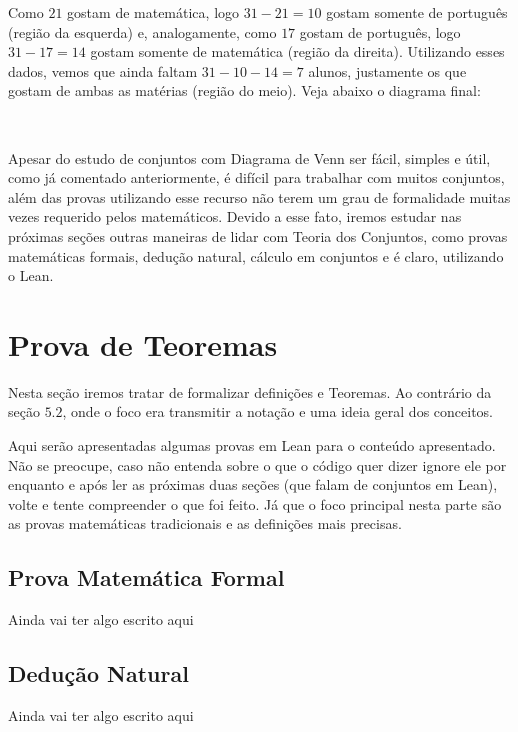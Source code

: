   Como $21$ gostam de matemática, logo $31-21=10$ gostam somente de português (região da esquerda) e, analogamente, como $17$ gostam de português, logo $31-17=14$ gostam somente de matemática (região da direita). Utilizando esses dados, vemos que ainda faltam $31-10-14=7$ alunos, justamente os que gostam de ambas as matérias (região do meio). Veja abaixo o diagrama final:


  $\qquad$

  Apesar do estudo de conjuntos com Diagrama de Venn ser fácil, simples e útil, como já comentado anteriormente, é difícil para trabalhar com muitos conjuntos, além das provas utilizando esse recurso não terem um grau de formalidade muitas vezes requerido pelos matemáticos. Devido a esse fato, iremos estudar nas próximas seções outras maneiras de lidar com Teoria dos Conjuntos, como provas matemáticas formais, dedução natural, cálculo em conjuntos e é claro, utilizando o Lean.

\section{Prova de Teoremas}
Nesta seção iremos tratar de formalizar definições e Teoremas. Ao contrário da seção $5.2$, onde o foco era transmitir a notação e uma ideia geral dos conceitos.

Aqui serão apresentadas algumas provas em Lean para o conteúdo apresentado. Não se preocupe, caso não entenda sobre o que o código quer dizer ignore ele por enquanto e após ler as próximas duas seções (que falam de conjuntos em Lean), volte e tente compreender o que foi feito. Já que o foco principal nesta parte são as provas matemáticas tradicionais e as definições mais precisas.

  \subsection{Prova Matemática Formal}
  Ainda vai ter algo escrito aqui

  \subsection{Dedução Natural}
  Ainda vai ter algo escrito aqui

